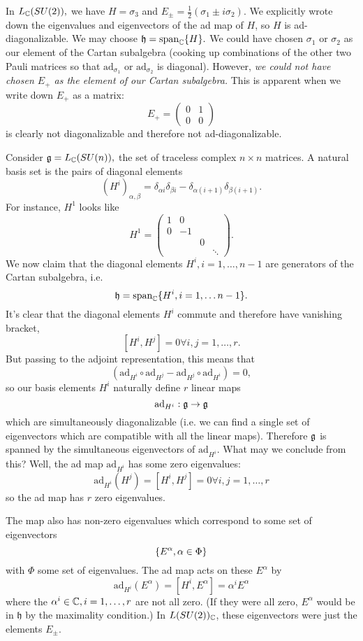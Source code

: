 \begin{exm}
In $L_{\mathbb{C}}(SU(2)),$ we have $H=\sigma_3$ and $E_{\pm}=\frac{1}{2}(\sigma_1\pm i\sigma_2)$. We explicitly wrote down the eigenvalues and eigenvectors of the ad map of $H$, so $H$ is ad-diagonalizable. We may choose
$\mathfrak{h}=\text{span}_{\mathbb{C}} \{H\}.$
We could have chosen $\sigma_1$ or $\sigma_2$ as our element of the Cartan subalgebra (cooking up combinations of the other two Pauli matrices so that $\text{ad}_{\sigma_1}$ or $\text{ad}_{\sigma_2}$ is diagonal). However, \emph{we could not have chosen $E_+$ as the element of our Cartan subalgebra.} This is apparent when we write down $E_+$ as a matrix:
$$E_+=\begin{pmatrix}
0&1\\0&0
\end{pmatrix}$$
is clearly not diagonalizable and therefore not ad-diagonalizable.
\end{exm}
\begin{exm}
Consider $\mathfrak{g}=L_{\mathbb{C}} (SU(n)),$ the set of traceless complex $n\times n$ matrices. A natural basis set is the pairs of diagonal elements
$$(H^i)_{\alpha,\beta}=\delta_{\alpha i} \delta_{\beta i}-\delta_{\alpha (i+1)}\delta_{\beta(i+1)}.$$
For instance, $H^1$ looks like
$$H^1=\begin{pmatrix}
1 & 0& &\\
0 & -1 & &\\
& & 0 &\\
& & & \ddots
\end{pmatrix}.$$
We now claim that the diagonal elements $H^i, i=1,\ldots, n-1$ are generators of the Cartan subalgebra, i.e.
$$\mathfrak{h}=\text{span}_{\mathbb{C}}\{H^i, i=1,\ldots n-1\}.$$
It's clear that the diagonal elements $H^i$ commute and therefore have vanishing bracket,
$$[H^i,H^j]=0\forall i,j=1,\ldots,r.$$
But passing to the adjoint representation, this means that
$$(\text{ad}_{H^i}\circ \text{ad}_{H^j} - \text{ad}_{H^j}\circ \text{ad}_{H^i})=0,$$
so our basis elements $H^i$ naturally define $r$ linear maps
$$\text{ad}_{H^i}:\mathfrak{g} \to \mathfrak{g}$$
which are simultaneously diagonalizable (i.e. we can find a single set of eigenvectors which are compatible with all the linear maps).
Therefore $\mathfrak{g}$ is spanned by the simultaneous eigenvectors of $\text{ad}_{H^i}.$ What may we conclude from this? Well, the ad map $\text{ad}_{H^i}$ has some zero eigenvalues:
$$\text{ad}_{H^i}(H^j)=[H^i,H^j]=0\forall i,j =1,\ldots,r$$
so the ad map has $r$ zero eigenvalues.

The map also has non-zero eigenvalues which correspond to some set of eigenvectors
$$\{E^\alpha, \alpha \in \Phi\}$$
with $\Phi$ some set of eigenvalues. The ad map acts on these $E^\alpha$ by
$$\text{ad}_{H^i}(E^\alpha)=[H^i, E^\alpha]=\alpha^i E^\alpha$$
where the $\alpha^i\in \mathbb{C}, i=1,\ldots, r$ are not all zero. (If they were all zero, $E^\alpha$ would be in $\mathfrak{h}$ by the maximality condition.) In $L(SU(2))_{\mathbb{C}}$, these eigenvectors were just the elements $E_\pm.$
\end{exm}

